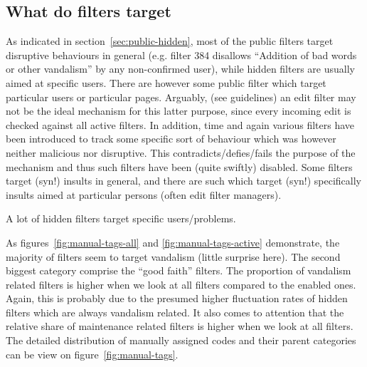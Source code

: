\subsection{What do filters target}

As indicated in section~\ref{sec:public-hidden}, most of the public filters target disruptive behaviours in general (e.g. filter 384 disallows ``Addition of bad words or other vandalism'' by any non-confirmed user), while hidden filters are usually aimed at specific users.
There are however some public filter which target particular users or particular pages.
Arguably, (see guidelines) an edit filter may not be the ideal mechanism for this latter purpose, since every incoming edit is checked against all active filters.
In addition, time and again various filters have been introduced to track some specific sort of behaviour which was however neither malicious nor disruptive.
This contradicts/defies/fails the purpose of the mechanism and thus such filters have been (quite swiftly) disabled.
Some filters target (syn!) insults in general, and there are such which target (syn!) specifically insults aimed at particular persons (often edit filter managers).

A lot of hidden filters target specific users/problems.

As figures~\ref{fig:manual-tags-all} and \ref{fig:manual-tags-active} demonstrate, the majority of filters seem to target vandalism (little surprise here).
The second biggest category comprise the ``good faith'' filters. %
The proportion of vandalism related filters is higher when we look at all filters compared to the enabled ones.
Again, this is probably due to the presumed higher fluctuation rates of hidden filters which are always vandalism related.
It also comes to attention that the relative share of maintenance related filters is higher when we look at all filters.
The detailed distribution of manually assigned codes and their parent categories can be view on figure~\ref{fig:manual-tags}.

